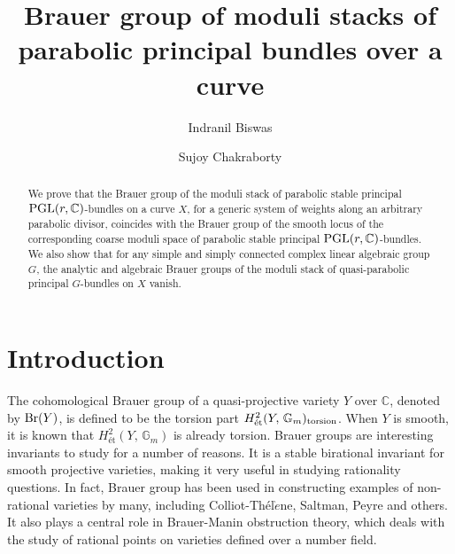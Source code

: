 \documentclass[10pt,reqno]{amsart}
\DeclareMathOperator{\Br}{\textnormal{Br}}
\newcommand{\bb}[1]{\mathbb{#1}}
\theoremstyle{myroman}
\numberwithin{equation}{section}
\begin{document}
	
	\baselineskip=15.5pt 
	
	\title[Brauer group of moduli stacks of parabolic principal bundles]{Brauer group of moduli stacks of parabolic principal bundles over a curve}
	
	\author[I. Biswas]{Indranil Biswas}
	
	\address{Mathematics Department, Shiv Nadar University, NH91, Tehsil Dadri,	Greater Noida, Uttar Pradesh 201314, India}
	
	
	\author[S. Chakraborty]{Sujoy Chakraborty}
	
	\address{Department of Mathematics, 
		Indian Institute of Science Education and Research Tirupati, Andhra Pradesh 517507, India}
	
	
	
	
	\begin{abstract}
		We prove that the Brauer group of the moduli stack of parabolic stable
		principal $\textnormal{PGL}(r,\bb{C})$-bundles on a 
		curve $X$, for a generic system of weights along an arbitrary parabolic divisor, coincides with the Brauer group 
		of the smooth locus of the corresponding coarse moduli space of parabolic stable principal
		$\textnormal{PGL}(r,\bb{C})$-bundles. We also show that for any simple and simply connected complex linear 
		algebraic group $G$, the analytic and algebraic Brauer groups of the moduli stack of quasi-parabolic principal 
		$G$-bundles on $X$ vanish.
	\end{abstract}
	\maketitle
	
	\section{Introduction}
	
	The cohomological Brauer group of a quasi-projective variety $Y$ over $\bb{C}$, denoted by $\Br(Y)$, is 
	defined to be the torsion part $H^2_{\text{\'et}}(Y,\,\bb{G}_m)_{\rm torsion}$. When $Y$ is smooth, it is known that 
	$H^2_{\text{\'et}}(Y,\,\bb{G}_m)$ is already torsion. Brauer groups are interesting invariants to study for a 
	number of reasons. It is a stable birational invariant for smooth projective varieties, 
	making it very useful in studying rationality questions. In fact, Brauer group has been used in constructing 
	examples of non-rational varieties by many, including Colliot-Th\'el$\grave{e}$ne, Saltman, Peyre and 
	others. It also plays a central role in Brauer-Manin obstruction theory, which deals with the study of 
	rational points on varieties defined over a number field.
	
\end{document}
